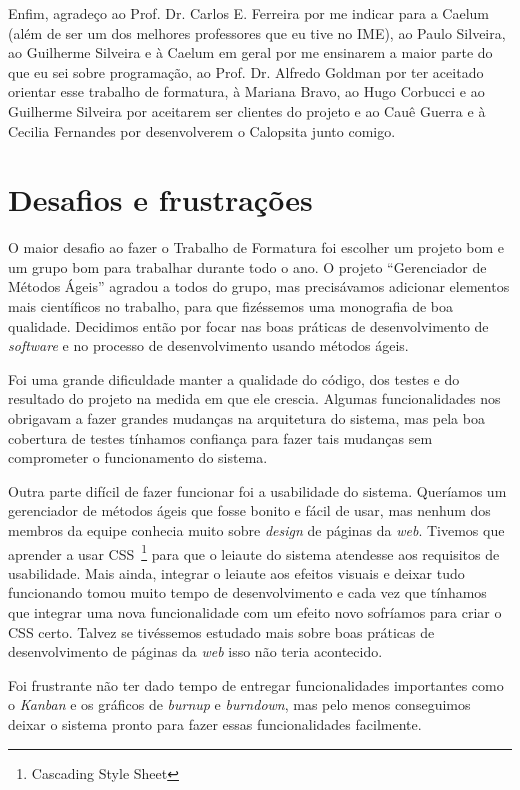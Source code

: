 \documentclass[titlepage,a4paper]{article}
\newcommand{\software}{\textit{software}}
\newcommand{\calopsita}{Calopsita}
\begin{document}
Enfim, agradeço ao Prof. Dr. Carlos E. Ferreira por me indicar para a Caelum (além de ser um dos melhores professores que eu tive no IME), ao Paulo Silveira, ao Guilherme Silveira e à Caelum em geral por me ensinarem a maior parte do que eu sei sobre programação, ao Prof. Dr. Alfredo Goldman por ter aceitado orientar esse trabalho de formatura, à Mariana Bravo, ao Hugo Corbucci e ao Guilherme Silveira por aceitarem ser clientes do projeto e ao Cauê Guerra e à Cecilia Fernandes por desenvolverem o \calopsita{} junto comigo.

\section{Desafios e frustrações}

O maior desafio ao fazer o Trabalho de Formatura foi escolher um projeto bom e um grupo bom para trabalhar durante todo o ano. O projeto ``Gerenciador de Métodos Ágeis'' agradou a todos do grupo, mas precisávamos adicionar elementos mais científicos no trabalho, para que fizéssemos uma monografia de boa qualidade. Decidimos então por focar nas boas práticas de desenvolvimento de \software{} e no processo de desenvolvimento usando métodos ágeis.

Foi uma grande dificuldade manter a qualidade do código, dos testes e do resultado do projeto na medida em que ele crescia. Algumas funcionalidades nos obrigavam a fazer grandes mudanças na arquitetura do sistema, mas pela boa cobertura de testes tínhamos confiança para fazer tais mudanças sem comprometer o funcionamento do sistema.

Outra parte difícil de fazer funcionar foi a usabilidade do sistema. Queríamos um gerenciador de métodos ágeis que fosse bonito e fácil de usar, mas nenhum dos membros da equipe conhecia muito sobre \textit{design} de páginas da \textit{web}. Tivemos que aprender a usar CSS~\footnote{Cascading Style Sheet} para que o leiaute do sistema atendesse aos requisitos de usabilidade. Mais ainda, integrar o leiaute aos efeitos visuais e deixar tudo funcionando tomou muito tempo de desenvolvimento e cada vez que tínhamos que integrar uma nova funcionalidade com um efeito novo sofríamos para criar o CSS certo. Talvez se tivéssemos estudado mais sobre boas práticas de desenvolvimento de páginas da \textit{web} isso não teria acontecido.

Foi frustrante não ter dado tempo de entregar funcionalidades importantes como o \textit{Kanban} e os gráficos de \textit{burnup} e \textit{burndown}, mas pelo menos conseguimos deixar o sistema pronto para fazer essas funcionalidades facilmente.
\end{document}
